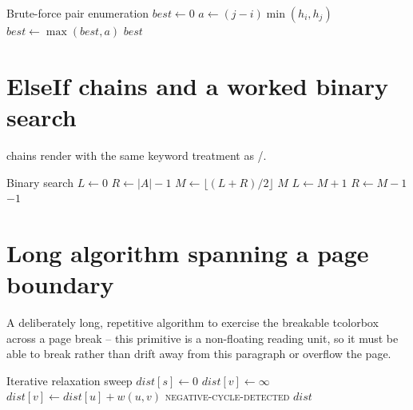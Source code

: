 \documentclass{reportkit}
\begin{document}
\begin{algorithmblock}{Brute-force pair enumeration}
  \State $best \gets 0$
      \State $a \gets (j-i)\min(h_i,h_j)$
      \State $best \gets \max(best,a)$
    \EndFor
  \EndFor
  \State \Return $best$
\end{algorithmblock}

\section{ElseIf chains and a worked binary search}
\texttt{\string\ElsIf} chains render with the same keyword treatment as
\texttt{\string\If}/\texttt{\string\Else}.

\begin{algorithmblock}[label={alg:binarysearch}]{Binary search}
  \State $L \gets 0$
  \State $R \gets |A|-1$
    \State $M \gets \lfloor (L+R)/2 \rfloor$
      \State \Return $M$
      \State $L \gets M+1$
    \Else
      \State $R \gets M-1$
    \EndIf
  \EndWhile
  \State \Return $-1$
\end{algorithmblock}

\section{Long algorithm spanning a page boundary}
A deliberately long, repetitive algorithm to exercise the breakable
tcolorbox across a page break -- this primitive is a non-floating reading
unit, so it must be able to break rather than drift away from this
paragraph or overflow the page.

\begin{algorithmblock}{Iterative relaxation sweep}
  \State $dist[s] \gets 0$
    \State $dist[v] \gets \infty$
  \EndFor
        \State $dist[v] \gets dist[u] + w(u,v)$
      \EndIf
    \EndFor
  \EndFor
      \State \Return \textsc{negative-cycle-detected}
    \EndIf
  \EndFor
    \State {}
  \EndFor
    \State {}
  \EndFor
    \State {}
  \EndFor
  \State \Return $dist$
\end{algorithmblock}
\end{document}
